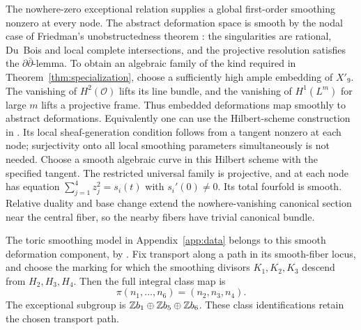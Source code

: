 The nowhere-zero exceptional relation supplies a global first-order
smoothing nonzero at every node. The abstract deformation space is
smooth by the nodal case of Friedman's unobstructedness theorem
\cite[Theorem 1.6]{Friedman}: the singularities are rational,
Du~Bois and local complete intersections, and the projective
resolution satisfies the $\partial\bar\partial$-lemma.
To obtain an algebraic family of the kind required in
Theorem~\ref{thm:specialization}, choose a sufficiently high ample
embedding of $X'_9$. The vanishing of $H^2(\mathcal O)$ lifts its
line bundle, and the vanishing of $H^1(L^m)$ for large $m$ lifts a
projective frame. Thus embedded deformations map smoothly to
abstract deformations. Equivalently one can use the Hilbert-scheme
construction in \cite[Theorem 4.1]{FMR}. Its local sheaf-generation
condition follows from a tangent nonzero at each node; surjectivity
onto all local smoothing parameters simultaneously is not needed.
Choose a smooth algebraic curve in this Hilbert scheme with the
specified tangent. The restricted universal family is projective,
and at each node has equation
$\sum_{j=1}^4 z_j^2=s_i(t)$ with $s_i'(0)\ne0$.
Its total fourfold is smooth. Relative duality and base change extend
the nowhere-vanishing canonical section near the central fiber, so
the nearby fibers have trivial canonical bundle.

The toric smoothing model in Appendix~\ref{app:data} belongs to this
smooth deformation component, by \cite[Theorem 9.25]{WuebbenMirror}.
Fix transport along a path in its smooth-fiber locus, and choose the
marking for which the smoothing divisors $K_1,K_2,K_3$ descend from
$H_2,H_3,H_4$. Then the full integral class map is
\begin{equation}\label{eq:pi}
 \pi(n_1,\ldots,n_6)=(n_2,n_3,n_4).
\end{equation}
The exceptional subgroup is $\mathbb Z b_1\oplus\mathbb Z b_5\oplus\mathbb Z b_6$.
These class identifications retain the chosen transport path.

